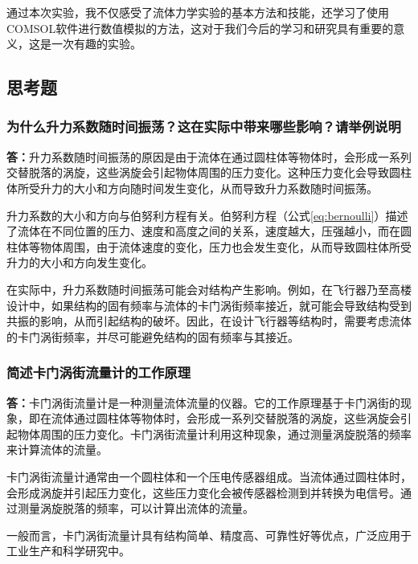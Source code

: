 \documentclass[a4paper,zihao=5,UTF8,fontset=fandol]{phyreport}
\begin{document}
通过本次实验，我不仅感受了流体力学实验的基本方法和技能，还学习了使用COMSOL软件进行数值模拟的方法，这对于我们今后的学习和研究具有重要的意义，这是一次有趣的实验。
\subsection{思考题}
\subsubsection{为什么升力系数随时间振荡？这在实际中带来哪些影响？请举例说明}
\textbf{答：}升力系数随时间振荡的原因是由于流体在通过圆柱体等物体时，会形成一系列交替脱落的涡旋，这些涡旋会引起物体周围的压力变化。这种压力变化会导致圆柱体所受升力的大小和方向随时间发生变化，从而导致升力系数随时间振荡。

升力系数的大小和方向与伯努利方程有关。伯努利方程（公式\ref{eq:bernoulli}）描述了流体在不同位置的压力、速度和高度之间的关系，速度越大，压强越小，而在圆柱体等物体周围，由于流体速度的变化，压力也会发生变化，从而导致圆柱体所受升力的大小和方向发生变化。

在实际中，升力系数随时间振荡可能会对结构产生影响。例如，在飞行器乃至高楼设计中，如果结构的固有频率与流体的卡门涡街频率接近，就可能会导致结构受到共振的影响，从而引起结构的破坏。因此，在设计飞行器等结构时，需要考虑流体的卡门涡街频率，并尽可能避免结构的固有频率与其接近。

\subsubsection{简述卡门涡街流量计的工作原理}
\textbf{答：}卡门涡街流量计是一种测量流体流量的仪器。它的工作原理基于卡门涡街的现象，即在流体通过圆柱体等物体时，会形成一系列交替脱落的涡旋，这些涡旋会引起物体周围的压力变化。卡门涡街流量计利用这种现象，通过测量涡旋脱落的频率来计算流体的流量。

卡门涡街流量计通常由一个圆柱体和一个压电传感器组成。当流体通过圆柱体时，会形成涡旋并引起压力变化，这些压力变化会被传感器检测到并转换为电信号。通过测量涡旋脱落的频率，可以计算出流体的流量。

一般而言，卡门涡街流量计具有结构简单、精度高、可靠性好等优点，广泛应用于工业生产和科学研究中。

\endBox
\end{document}
